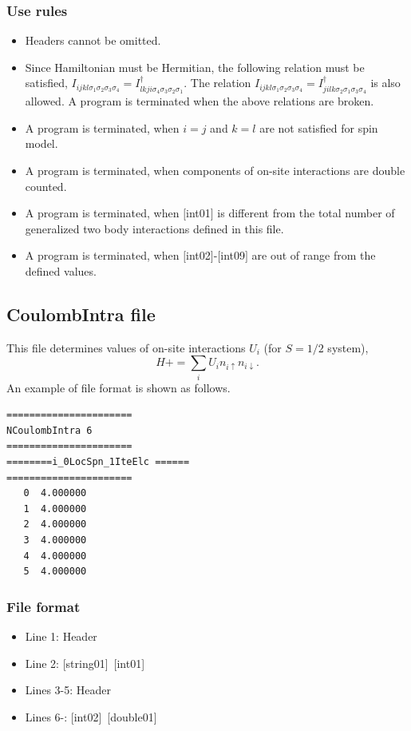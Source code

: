 \subsubsection{Use rules}
\begin{itemize}
\item Headers cannot be omitted. 
\item Since Hamiltonian must be Hermitian, the following relation must be satisfied, $I_{ijkl\sigma_1\sigma_2\sigma_3\sigma_4}=I_{lkji\sigma_4\sigma_3\sigma_2\sigma_1}^{\dag}$. The relation  $I_{ijkl\sigma_1\sigma_2\sigma_3\sigma_4}=I_{jilk\sigma_2\sigma_1\sigma_3\sigma_4}^{\dag}$ is also allowed. A program is terminated when the above relations are broken.
\item {A program is terminated, when $i=j$ and $k=l$ are not satisfied for spin model.}
\item A program is terminated, when components of on-site interactions are double counted.
\item A program is terminated, when $[$int01$]$ is different from the total number of generalized two body interactions defined in this file.
\item A program is terminated, when $[$int02$]$-$[$int09$]$ are out of range from the defined values.
\end{itemize}


\newpage
\subsection{CoulombIntra file}
This file determines values of on-site interactions $U_i$ {(for $S=1/2$ system)},
\begin{equation}
H+=\sum_{i}U_i n_ {i \uparrow}n_{i \downarrow}.
\end{equation}
An example of file format is shown as follows.

\begin{minipage}{12.5cm}
\begin{screen}
\begin{verbatim}
====================== 
NCoulombIntra 6  
====================== 
========i_0LocSpn_1IteElc ====== 
====================== 
   0  4.000000
   1  4.000000
   2  4.000000
   3  4.000000
   4  4.000000
   5  4.000000
\end{verbatim}
\end{screen}
\end{minipage}

\subsubsection{File format}
 \begin{itemize}
   \item  Line 1:  Header
   \item  Line 2:   [string01]~[int01]
   \item  Lines 3-5:  Header
   \item  Lines 6-:  [int02]~[double01] 
  \end{itemize}

